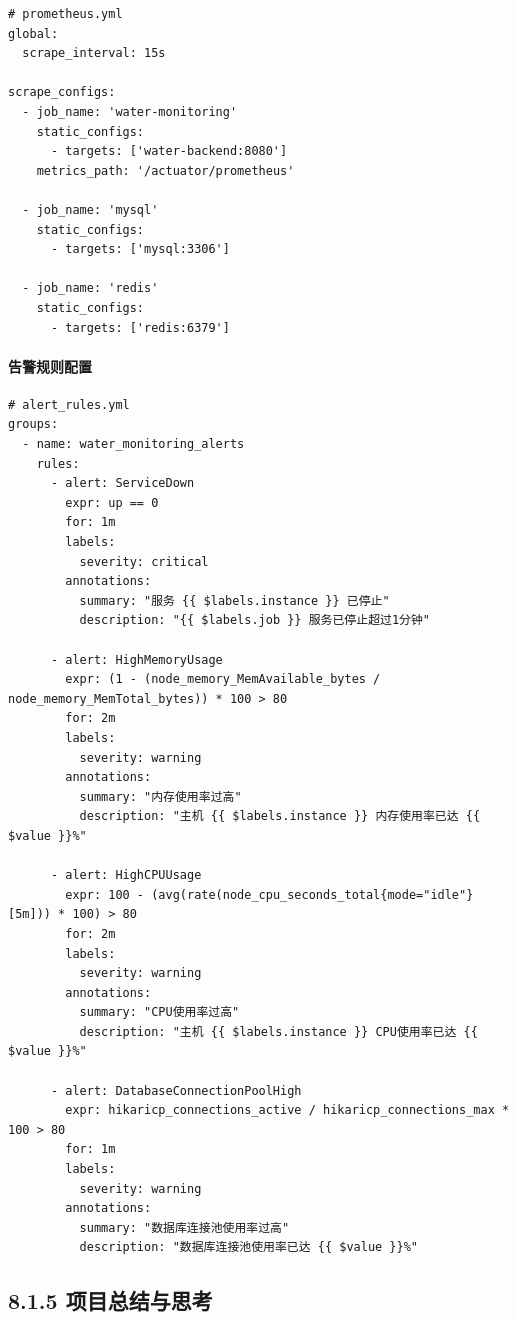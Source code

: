 \begin{lstlisting}
# prometheus.yml
global:
  scrape_interval: 15s

scrape_configs:
  - job_name: 'water-monitoring'
    static_configs:
      - targets: ['water-backend:8080']
    metrics_path: '/actuator/prometheus'

  - job_name: 'mysql'
    static_configs:
      - targets: ['mysql:3306']

  - job_name: 'redis'
    static_configs:
      - targets: ['redis:6379']
\end{lstlisting}

\paragraph{告警规则配置}\label{ux544aux8b66ux89c4ux5219ux914dux7f6e}

\begin{lstlisting}
# alert_rules.yml
groups:
  - name: water_monitoring_alerts
    rules:
      - alert: ServiceDown
        expr: up == 0
        for: 1m
        labels:
          severity: critical
        annotations:
          summary: "服务 {{ $labels.instance }} 已停止"
          description: "{{ $labels.job }} 服务已停止超过1分钟"

      - alert: HighMemoryUsage
        expr: (1 - (node_memory_MemAvailable_bytes / node_memory_MemTotal_bytes)) * 100 > 80
        for: 2m
        labels:
          severity: warning
        annotations:
          summary: "内存使用率过高"
          description: "主机 {{ $labels.instance }} 内存使用率已达 {{ $value }}%"

      - alert: HighCPUUsage
        expr: 100 - (avg(rate(node_cpu_seconds_total{mode="idle"}[5m])) * 100) > 80
        for: 2m
        labels:
          severity: warning
        annotations:
          summary: "CPU使用率过高"
          description: "主机 {{ $labels.instance }} CPU使用率已达 {{ $value }}%"

      - alert: DatabaseConnectionPoolHigh
        expr: hikaricp_connections_active / hikaricp_connections_max * 100 > 80
        for: 1m
        labels:
          severity: warning
        annotations:
          summary: "数据库连接池使用率过高"
          description: "数据库连接池使用率已达 {{ $value }}%"
\end{lstlisting}

\subsection{8.1.5
项目总结与思考}\label{ux9879ux76eeux603bux7ed3ux4e0eux601dux8003}

